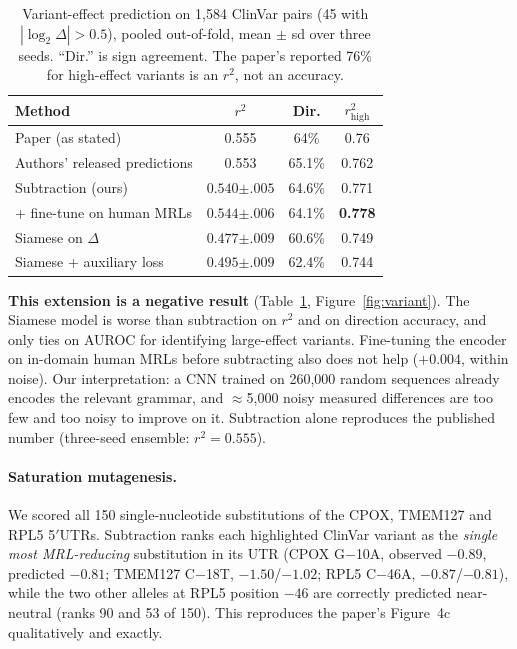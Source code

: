 \documentclass{article}
\begin{document}
\begin{table}[t]
\caption{Variant-effect prediction on 1{,}584 ClinVar pairs (45 with
$|\log_2\Delta|>0.5$), pooled out-of-fold, mean $\pm$ sd over three seeds. ``Dir.'' is sign
agreement. The paper's reported 76\% for high-effect variants is an $r^2$, not an accuracy.}
\label{tab:variant}
\vskip 0.1in
\begin{center}
\begin{small}
\setlength{\tabcolsep}{4pt}
\begin{tabular}{lccc}
\toprule
Method & $r^2$ & Dir. & $r^2_{\text{high}}$ \\
\midrule
Paper (as stated) & 0.555 & 64\% & 0.76 \\
Authors' released predictions & 0.553 & 65.1\% & 0.762 \\
\midrule
Subtraction (ours) & $0.540${\scriptsize$\pm.005$} & 64.6\% & 0.771 \\
\quad + fine-tune on human MRLs & $0.544${\scriptsize$\pm.006$} & 64.1\% & \textbf{0.778} \\
Siamese on $\Delta$ & $0.477${\scriptsize$\pm.009$} & 60.6\% & 0.749 \\
Siamese + auxiliary loss & $0.495${\scriptsize$\pm.009$} & 62.4\% & 0.744 \\
\bottomrule
\end{tabular}
\end{small}
\end{center}
\vskip -0.1in
\end{table}

\textbf{This extension is a negative result} (Table~\ref{tab:variant},
Figure~\ref{fig:variant}). The Siamese model is worse than subtraction on $r^2$ and on
direction accuracy, and only ties on AUROC for identifying large-effect variants. Fine-tuning
the encoder on in-domain human MRLs before subtracting also does not help ($+0.004$, within
noise). Our interpretation: a CNN trained on 260{,}000 random sequences already encodes the
relevant grammar, and $\approx$5{,}000 noisy measured differences are too few and too noisy
to improve on it. Subtraction alone reproduces the published number
(three-seed ensemble: $r^2 = 0.555$).

\paragraph{Saturation mutagenesis.} We scored all 150 single-nucleotide substitutions of the
CPOX, TMEM127 and RPL5 5$'$UTRs. Subtraction ranks each highlighted ClinVar variant as the
\emph{single most MRL-reducing} substitution in its UTR (CPOX G$-$10A, observed $-0.89$,
predicted $-0.81$; TMEM127 C$-$18T, $-1.50$/$-1.02$; RPL5 C$-$46A, $-0.87$/$-0.81$), while
the two other alleles at RPL5 position $-46$ are correctly predicted near-neutral (ranks 90
and 53 of 150). This reproduces the paper's Figure~4c qualitatively and exactly.
\end{document}

